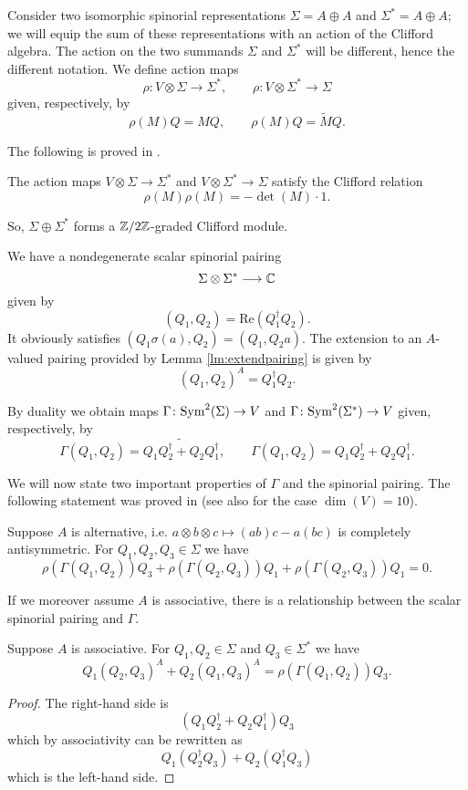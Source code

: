 \documentclass[10pt, oneside]{article}
\renewcommand{\Re}{\mathrm{Re}}
\begin{document}
Consider two isomorphic spinorial representations $\Sigma=A\oplus A$ and $\Sigma^* = A\oplus A$; we will equip the sum of these representations with an action of the Clifford algebra.  The action on the two summands $\Sigma$ and $\Sigma^*$ will be different, hence the different notation.  We define action maps
\[\rho \colon V \otimes \Sigma\rightarrow \Sigma^*,\qquad \rho \colon V\otimes \Sigma^*\rightarrow \Sigma\]
given, respectively, by
\[\rho(M)Q = M Q,\qquad \rho(M)Q = \widetilde{M} Q.\]

The following is proved in \cite[Proposition 6]{BaezHuerta}.

\begin{prop}
The action maps $V\otimes \Sigma\rightarrow \Sigma^*$ and $V\otimes \Sigma^*\rightarrow \Sigma$ satisfy the Clifford relation
\[\rho(M)\rho(M) = -\det(M)\cdot 1.\]
\end{prop}

So, $\Sigma\oplus \Sigma^*$ forms a $\mathbb Z/2\mathbb Z$-graded Clifford module.

We have a nondegenerate scalar spinorial pairing
\[\Sigma\otimes \Sigma^*\longrightarrow \mathbb C\]
given by
\[(Q_1, Q_2) = \Re(Q_1^\dagger Q_2).\]
It obviously satisfies $(Q_1 \sigma(a), Q_2) = (Q_1, Q_2 a)$. The extension to an $A$-valued pairing provided by Lemma \ref{lm:extendpairing} is given by
\[(Q_1, Q_2)^A = Q_1^\dagger Q_2.\]

By duality we obtain maps $\Gamma\colon{\rm Sym}^2(\Sigma)\rightarrow V$ and $\Gamma\colon {\rm Sym}^2(\Sigma^*)\rightarrow V$ given, respectively, by
\[\Gamma(Q_1, Q_2) = \widetilde{Q_1Q_2^\dagger + Q_2Q_1^\dagger},\qquad \Gamma(Q_1, Q_2) = Q_1Q_2^\dagger + Q_2Q_1^\dagger.\]

We will now state two important properties of $\Gamma$ and the spinorial pairing. The following statement was proved in \cite[Theorem 11]{BaezHuerta} (see also \cite{Schray} for the case $\dim(V)=10$).

\begin{theorem}
Suppose $A$ is alternative, i.e. $a\otimes b\otimes c\mapsto (ab)c - a(bc)$ is completely antisymmetric. For $Q_1, Q_2, Q_3\in\Sigma$ we have
\[\rho(\Gamma(Q_1, Q_2))Q_3 + \rho(\Gamma(Q_2, Q_3))Q_1 + \rho(\Gamma(Q_2, Q_3))Q_1 = 0.\]
\label{thm:3psi}
\end{theorem}

If we moreover assume $A$ is associative, there is a relationship between the scalar spinorial pairing and $\Gamma$.

\begin{theorem}
Suppose $A$ is associative. For $Q_1, Q_2\in\Sigma$ and $Q_3\in\Sigma^*$ we have
\[Q_1(Q_2, Q_3)^A + Q_2(Q_1, Q_3)^A = \rho(\Gamma(Q_1, Q_2)) Q_3.\]
\label{thm:matter3psi}
\end{theorem}
\begin{proof}
The right-hand side is
\[(Q_1Q_2^\dagger + Q_2Q_1^\dagger)Q_3\]
which by associativity can be rewritten as
\[Q_1(Q_2^\dagger Q_3) + Q_2(Q_1^\dagger Q_3)\]
which is the left-hand side.
\end{proof}
\end{document}
